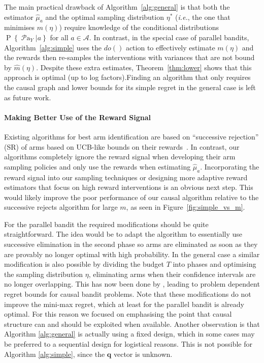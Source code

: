 \documentclass[11pt,a4paper,oneside]{book}
\newcommand{\Pn}[2]{\operatorname{P}\left\{#2|#1\right\}}
\newcommand{\calA}{\mathcal A}
\newcommand{\ie}{\textit{i.e.}}
\newcommand{\parents}[1]{\operatorname{\mathcal{P}a}_{#1}}
\renewcommand{\vec}[1]{\boldsymbol{#1}}
\theoremstyle{plain}
\theoremstyle{definition}
\begin{document}
The main practical drawback of Algorithm~\ref{alg:general} is that both the estimator $\hat{\mu}_a$ and the optimal sampling distribution $\eta^*$ (\ie, the one that minimises $m(\eta)$) require knowledge of the conditional distributions $\Pn{a}{\parents{Y}}$ for all $a \in \calA$. In contrast, in the special case of parallel bandits, Algorithm~\ref{alg:simple} uses the $do()$ action to effectively estimate $m(\eta)$ and the rewards then re-samples the interventions with variances that are not bound by $\hat{m}(\eta)$.
Despite these extra estimates, Theorem~\ref{thm:lower} shows that this approach is optimal (up to log factors).Finding an algorithm that only requires the causal graph and lower bounds for its simple regret in the general case is left as future work.


\paragraph{Making Better Use of the Reward Signal}
Existing algorithms for best arm identification are based on ``successive rejection'' (SR) of arms based on UCB-like bounds on their rewards~\citep{Even-Dar2002}. In contrast, our algorithms completely ignore the reward signal when developing their arm sampling policies and only use the rewards when estimating $\hat{\mu}_a$. Incorporating the reward signal into our sampling techniques or designing more adaptive reward estimators that focus on high reward interventions is an obvious next step. This would likely improve the poor performance of our causal algorithm relative to the successive rejects algorithm for large $m$, as seen in Figure~\ref{fig:simple_vs_m}.

For the parallel bandit the required modifications should be quite straightforward. The idea would be to adapt the algorithm to essentially use successive elimination in the second phase so arms are eliminated as soon as they are provably no longer optimal with high probability. In the general case a similar modification is also possible by dividing the budget $T$ into phases and optimising the sampling distribution $\eta$, eliminating arms when their confidence intervals are no longer overlapping. This has now been done by \citet{Sen2017a}, leading to problem dependent regret bounds for causal bandit problems. Note that these modifications do not improve the mini-max regret, which at least for the parallel bandit is already optimal. For this reason we focused on emphasising the point that causal structure can and should be exploited when available. Another observation is that Algorithm \ref{alg:general} is actually using a fixed design, which in some cases may be preferred to a sequential design for logistical reasons. This is not possible for Algorithm \ref{alg:simple}, since the $\vec{q}$ vector is unknown.
\end{document}
